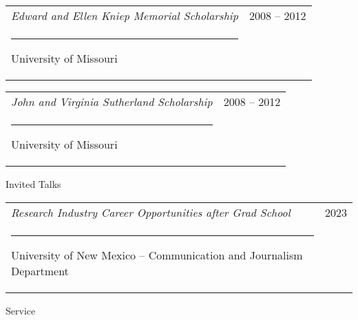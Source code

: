 \documentclass[letterpaper, 10pt]{extarticle}
\begin{document}
\vspace{0.5em}
\begin{tabularx}{\textwidth}{Xr}
\textit{Edward and Ellen Kniep Memorial Scholarship} & 2008 -- 2012\\
\rule{0.75em}{0pt}University of Missouri
\end{tabularx}

\vspace{0.5em}
\begin{tabularx}{\textwidth}{Xr}
\textit{John and Virginia Sutherland Scholarship} & 2008 -- 2012\\
\rule{0.75em}{0pt}University of Missouri
\end{tabularx}

\vspace{1em}
{\large Invited Talks}

\vspace{0.5em}
\begin{tabularx}{\textwidth}{Xr}
\textit{Research Industry Career Opportunities after Grad School} & 2023\\
\rule{0.75em}{0pt}University of New Mexico -- Communication and Journalism Department
\end{tabularx}

\vspace{1em}
{\large Service}
\end{document}
